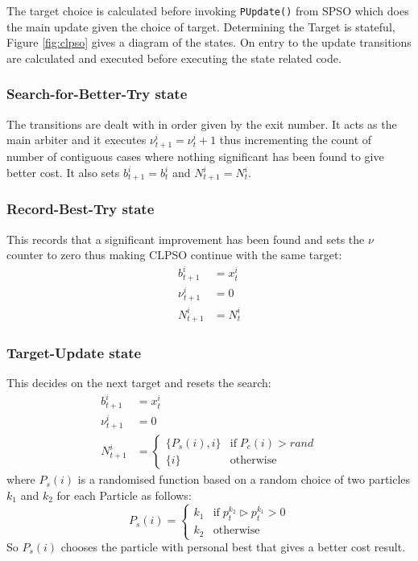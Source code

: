 \documentclass[a4paper,oneside,english]{book}
\numberwithin{equation}{section}
\numberwithin{figure}{section}
\begin{document}
The target choice is calculated before invoking \texttt{PUpdate()}  from SPSO which does the main update given the choice of target. Determining the Target is stateful,  Figure \ref{fig:clpso} gives a diagram of the states. On entry to the update transitions are calculated and executed before executing the state related code. 

\subsubsection{Search-for-Better-Try state}
The transitions are dealt with in order given by the exit number. It acts as the main arbiter and it executes $\nu^i_{t+1}  = \nu^i_t +1 $ thus incrementing the count of number of contiguous cases where nothing significant has been found to give better cost. It also sets $b^i_{t+1} = b^i_t$ and $N^i_{t+1}=N^i_t$.
\subsubsection{Record-Best-Try state}
This records that a significant improvement has been found and sets the $\nu$ counter to zero thus making CLPSO  continue with the same target:
\begin{align}
	b^i_{t+1}&=x^i_t\\
	\nu^i_{t+1}&=0\\
	N^i_{t+1}&=N^i_t
\end{align} 
\subsubsection{Target-Update state}
This decides on the next target and resets the search:
\begin{align}
	b^i_{t+1}&=x^i_t\\
	\nu^i_{t+1}&=0\\
	N^i_{t+1}&= \left\lbrace
	\begin{array}{cc}
		\{P_s(i),i\}&\mathrm{if}\; P_c(i) > rand\\
		\{ i \} & \mathrm{otherwise}
	\end{array} \right .
\end{align}
where $P_s(i)$ is a randomised function based  on a random choice of two particles $k_1$ and  $k_2$  for each Particle as follows:
\begin{equation}\label{eqn:rand_CLpso_target}
	P_s(i) = \left\lbrace
	\begin{array}{cc}
		k_1 &\mathrm{ if}\; p^{k_2}_t \rhd p^{k_1}_t >0\\
		k_2& \mathrm{otherwise}
	\end{array}\right .
\end{equation}
So $P_s(i) $ chooses the particle with personal best that gives a better cost result.
 
\end{document}
